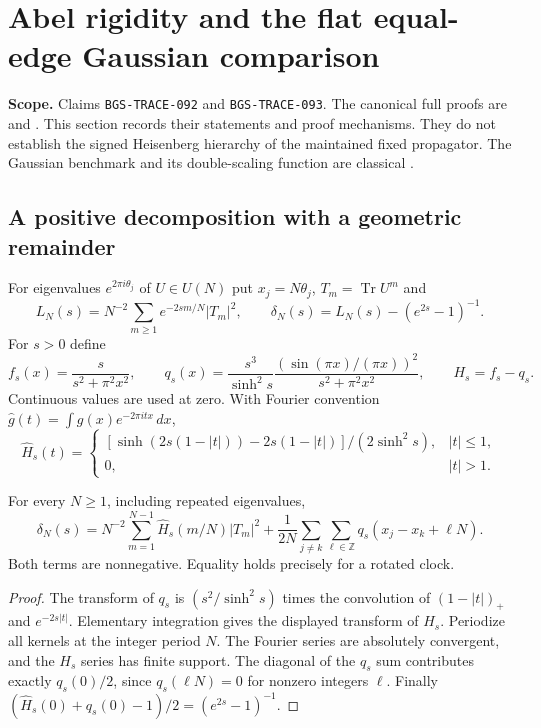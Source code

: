 \section{Abel rigidity and the flat equal-edge Gaussian comparison}
\label{sec:abel-gaussian-20261016}
\noindent\textbf{Scope.} Claims \texttt{BGS-TRACE-092} and
\texttt{BGS-TRACE-093}. The canonical full proofs are
 and
. This section records
their statements and proof mechanisms. They do not establish the signed
Heisenberg hierarchy of the maintained fixed propagator. The Gaussian
benchmark and its double-scaling function are classical
\cite{KPSS2002,ByunForrester2023}.

\subsection{A positive decomposition with a geometric remainder}
For eigenvalues $e^{2\pi i\theta_j}$ of $U\in U(N)$ put
$x_j=N\theta_j$, $T_m=\operatorname{Tr}U^m$ and
\[
 L_N(s)=N^{-2}\sum_{m\ge1}e^{-2sm/N}|T_m|^2,\qquad
 \delta_N(s)=L_N(s)-(e^{2s}-1)^{-1}.
\]
For $s>0$ define
\[
 f_s(x)=\frac{s}{s^2+\pi^2x^2},\qquad
 q_s(x)=\frac{s^3}{\sinh^2s}
      \frac{(\sin(\pi x)/(\pi x))^2}{s^2+\pi^2x^2},
 \qquad H_s=f_s-q_s.
\]
Continuous values are used at zero. With Fourier convention
$\widehat g(t)=\int g(x)e^{-2\pi itx}\,dx$,
\[
 \widehat H_s(t)=
 \begin{cases}
 [\sinh(2s(1-|t|))-2s(1-|t|)]/(2\sinh^2s),&|t|\le1,\\
 0,&|t|>1.
 \end{cases}
\]
\begin{theorem}
For every $N\ge1$, including repeated eigenvalues,
\begin{equation}
 \delta_N(s)=N^{-2}\sum_{m=1}^{N-1}\widehat H_s(m/N)|T_m|^2
   +\frac1{2N}\sum_{j\ne k}\sum_{\ell\in\mathbb Z}
                     q_s(x_j-x_k+\ell N).
 \label{eq:abel-positive-20261016}
\end{equation}
Both terms are nonnegative. Equality holds precisely for a rotated clock.
\end{theorem}
\begin{proof}
The transform of $q_s$ is $(s^2/\sinh^2s)$ times the convolution of
$(1-|t|)_+$ and $e^{-2s|t|}$. Elementary integration gives the displayed
transform of $H_s$. Periodize all kernels at the integer period $N$.
The Fourier series are absolutely convergent, and the $H_s$ series has
finite support. The diagonal of the $q_s$ sum contributes exactly
$q_s(0)/2$, since $q_s(\ell N)=0$ for nonzero integers $\ell$.
Finally $(\widehat H_s(0)+q_s(0)-1)/2=(e^{2s}-1)^{-1}$.
\end{proof}

